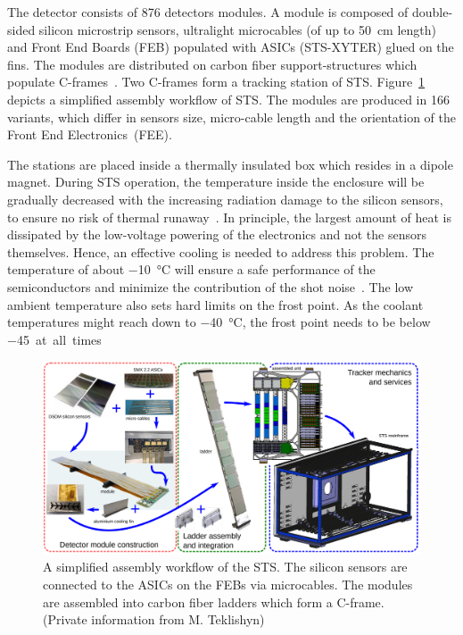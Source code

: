The detector consists of 876 detectors modules. A module is composed of double-sided silicon microstrip sensors, ultralight microcables (of up to 50~cm length) and Front End Boards (\gls{FEB}) populated with ASICs (STS-XYTER) glued on the fins. The modules are distributed on carbon fiber support-structures which populate C-frames~\cite{progress_report_2016}. Two C-frames form a tracking station of \gls{STS}.  Figure~\ref{fig_assembly} depicts a simplified assembly workflow of \gls{STS}.
The modules are produced in 166 variants, which differ in sensors size, micro-cable length and the orientation of the Front End Electronics~(\gls{FEE}).  


The stations are placed inside a thermally insulated box which resides in a dipole magnet. During \gls{STS} operation, the temperature inside the enclosure will be gradually decreased with the increasing radiation damage to the silicon sensors, to ensure no risk of thermal runaway~\cite{Spieler}. In principle, the largest amount of heat is dissipated by the low-voltage powering of the electronics and not the sensors themselves. Hence, an effective cooling is needed to address this problem.
The temperature of about \SI{-10}{\celsius} will ensure a safe performance of the semiconductors and minimize the contribution of the shot noise~\cite{Spieler}. The low ambient temperature also sets hard limits on the frost point. As the coolant temperatures might reach down to \SI{-40}{\celsius}, the frost point needs to be below \SI{-45} at all times. 

\newpage
\begin{figure}[!h]
\centering
\includegraphics[width=1\columnwidth]{Chapter2/images/assembly_sequence.png}
\caption{A simplified assembly workflow of the \gls{STS}. The silicon sensors are connected to the ASICs on the \glspl{FEB} via microcables. The modules are assembled into carbon fiber ladders which form a C-frame. (Private information from M. Teklishyn)}
\label{fig_assembly}
\end{figure}

